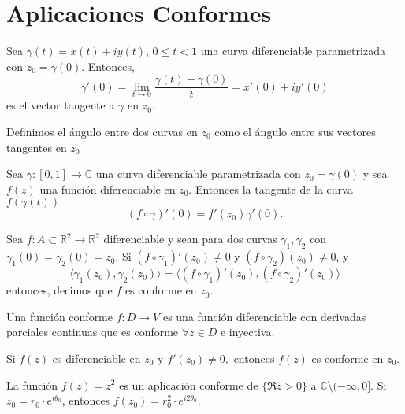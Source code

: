 \section{Aplicaciones Conformes}

\begin{defn}
  Sea $\gamma(t) = x(t) + i y(t)$, $0 \leq t < 1$ una curva diferenciable parametrizada con $z_{0} = \gamma(0)$. Entonces, 
  \[ 
    \gamma'(0) = \lim_{t \to 0} \frac{\gamma(t) - \gamma(0)}{t} = x'(0) + i y'(0) 
  \] 
  es el vector tangente a $\gamma$ en $z_{0}$.
\end{defn}

\begin{defn}
  Definimos el ángulo entre dos curvas en $z_{0}$ como el ángulo entre sus vectores tangentes en $z_{0}$
\end{defn}

\begin{theo}
  Sea $\gamma: [0,1] \to \mathbb{C}$ una curva diferenciable parametrizada con $z_{0} = \gamma(0)$ y sea $f(z)$ una función diferenciable en $z_{0}$. Entonces la tangente de la curva $f(\gamma(t))$
  \[ 
    (f \circ \gamma)'(0) = f'(z_{0}) \gamma'(0).
  \] 
\end{theo}

\begin{defn}
  Sea $f: A \subset \mathbb{R}^{2} \to \mathbb{R}^{2}$ diferenciable y sean para dos curvas $\gamma_{1}, \gamma_{2}$ con $\gamma_{1}(0) = \gamma_{2}(0) = z_{0}$. Si $(f \circ \gamma_{1})'(z_{0}) \neq 0$ y $(f \circ \gamma_{2})(z_{0}) \neq 0$, y 
  \[ 
    \langle \gamma_{1}(z_{0}){ , }\gamma_{2}(z_{0}) \rangle  = \langle (f \circ \gamma_{1})'(z_{0}){ , }(f \circ \gamma_{2})'(z_{0}) \rangle
  \] 
  entonces, decimos que $f$ es conforme en $z_{0}$.
\end{defn}

\begin{obs}
  Una función conforme $f: D \to V$ es una función diferenciable con derivadas parciales continuas que es conforme $\forall z \in D$ e inyectiva.
\end{obs}
 
\begin{theo}
  Si $f(z)$ es diferenciable en $z_{0}$ y $f'(z_{0}) \neq 0,$ entonces $f(z)$ es conforme en $z_{0}$.
\end{theo}

\begin{ejm}
  La función $f(z) = z^{2}$ es un aplicación conforme de $\{ \Re z > 0 \}$ a $\mathbb{C} \setminus (-\infty, 0]$. Si $z_{0} = r_{0} \cdot e^{i \theta_{0}}$, entonces $f(z_{0}) = r_{0}^{2} \cdot e^{i 2 \theta_{0}}$.
\end{ejm}
